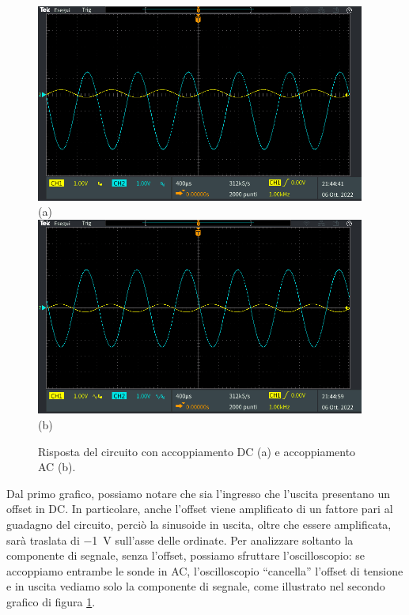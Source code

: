\documentclass{report}
\begin{document}
\begin{figure}
\centering
\includegraphics[height=6.5cm]{immagini/TEK00018}\\(a)\\[1ex]
\includegraphics[height=6.5cm]{immagini/TEK00019}\\(b)
\caption{Risposta del circuito con accoppiamento DC (a) e accoppiamento AC (b).}
	\label{figura:accopp}
\end{figure}
Dal primo grafico, possiamo notare che sia l'ingresso che l'uscita presentano un offset in DC. In particolare, anche l'offset viene amplificato di un fattore pari al guadagno del circuito, perciò la sinusoide in uscita, oltre che essere amplificata, sarà traslata di \SI{-1}{\volt} sull'asse delle ordinate. Per analizzare soltanto la componente di segnale, senza l'offset, possiamo sfruttare l'oscilloscopio: se accoppiamo entrambe le sonde in AC, l'oscilloscopio ``cancella'' l'offset di tensione e in uscita vediamo solo la componente di segnale, come illustrato nel secondo grafico di figura \ref{figura:accopp}.

\end{document}
